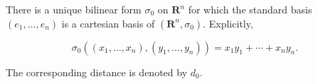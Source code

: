 There is a unique bilinear form $\sigma_0$ on $\mathbf{R}^n$ for which the standard basis $(e_1, \ldots, e_n)$ is a cartesian basis of $(\mathbf{R}^n, \sigma_0)$. Explicitly,

$$\sigma_0((x_1, \ldots, x_n), (y_1, \ldots, y_n)) = x_1 y_1 + \cdots + x_n y_n.$$

The corresponding distance is denoted by $d_0$.

